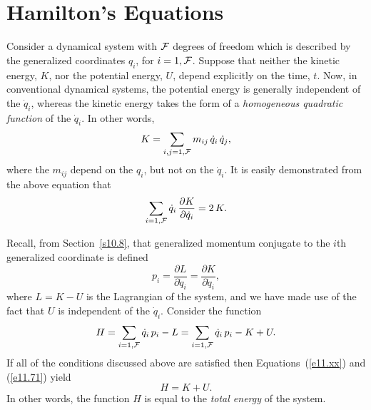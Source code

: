 \section{Hamilton's Equations}
Consider a dynamical system with ${\cal F}$ degrees of freedom which is described
by the generalized coordinates $q_i$, for $i=1,{\cal F}$. Suppose that
neither the kinetic energy, $K$, nor the potential energy, $U$, depend
explicitly on the time, $t$. Now, in conventional dynamical systems, the potential energy is generally independent of the $\dot{q}_i$, whereas the kinetic
energy takes the form of a {\em homogeneous quadratic function}\/ of
the $\dot{q}_i$. In other words,
\begin{equation}
K = \sum_{i,j = 1,{\cal F}} m_{ij}\,\dot{q}_i\,\dot{q}_j,
\end{equation}
where the $m_{ij}$ depend on the $q_i$, but not on the $\dot{q}_i$. 
It is easily demonstrated from the above equation that
\begin{equation}\label{e11.xx}
\sum_{i=1,{\cal F}} \dot{q}_i\,\frac{\partial K}{\partial \dot{q}_i} = 2\,K.
\end{equation}

Recall, from Section~\ref{s10.8}, that generalized momentum conjugate to the $i$th
generalized coordinate is defined
\begin{equation}\label{e11.71}
p_i = \frac{\partial L}{\partial \dot{q}_i} = \frac{\partial K}{\partial \dot{q}_i},
\end{equation}
where $L=K-U$ is the Lagrangian of the system, and we have made use of the fact that $U$ is independent of the $\dot{q}_i$. Consider the
function
\begin{equation}\label{e11.70}
H = \sum_{i=1,{\cal F}} \dot{q}_i\,p_i - L = \sum_{i=1,{\cal F}} \dot{q}_i\,p_i -K + U.
\end{equation}
If all of the conditions discussed above are satisfied then Equations~(\ref{e11.xx})
and (\ref{e11.71})
yield
\begin{equation}
H = K+ U.
\end{equation}
In other words, the function $H$ is equal to the {\em total energy}\/ of the system.


